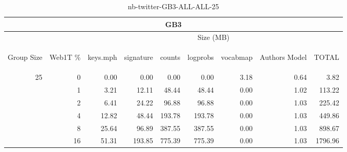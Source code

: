 \begin{center}
\begin{table}[htbp] 
 \begin{center}
\begin{tabular}{ | r | r | r | r | r | r | r | r | r |}
\hline
\multicolumn{9}{|c|}{GB3}\\
\hline
 & & \multicolumn{7}{|c|}{Size (MB)}\\ \cline{3-9}
\begin{sideways}Group Size\end{sideways} & \begin{sideways}Web1T \% \end{sideways} & \begin{sideways}keys.mph\end{sideways} & \begin{sideways}signature\end{sideways} & \begin{sideways}counts\end{sideways} & \begin{sideways}logprobs\end{sideways} & \begin{sideways}vocabmap\end{sideways} & \begin{sideways}Authors Model \end{sideways} & \begin{sideways}TOTAL\end{sideways}\\
\hline
\multirow{5}{*}{25}
 & 0 & 0.00 & 0.00 & 0.00 & 0.00 & 3.18 & 0.64 & 3.82\\ \cline{2-9}
 & 1 & 3.21 & 12.11 & 48.44 & 48.44 & 0.00 & 1.02 & 113.22\\ \cline{2-9}
 & 2 & 6.41 & 24.22 & 96.88 & 96.88 & 0.00 & 1.03 & 225.42\\ \cline{2-9}
 & 4 & 12.82 & 48.44 & 193.78 & 193.78 & 0.00 & 1.03 & 449.86\\ \cline{2-9}
 & 8 & 25.64 & 96.89 & 387.55 & 387.55 & 0.00 & 1.03 & 898.67\\ \cline{2-9}
 & 16 & 51.31 & 193.85 & 775.39 & 775.39 & 0.00 & 1.03 & 1796.96\\ \cline{2-9}
\hline
\end{tabular}
\caption{nb-twitter-GB3-ALL-ALL-25}
\label{table:nb-twitter-GB3-ALL-ALL-25}
\end{center}
 \end{table}
\end{center}

